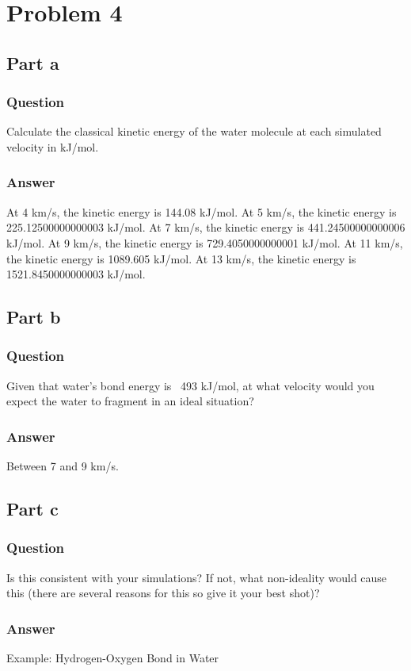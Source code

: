\documentclass[12pt]{article}
\begin{document}
\section{Problem 4}
\subsection{Part a}
\subsubsection{Question}
Calculate the classical kinetic energy of the water molecule at each simulated velocity in kJ/mol.
\subsubsection{Answer}
At 4 km/s, the kinetic energy is 144.08 kJ/mol.
At 5 km/s, the kinetic energy is 225.12500000000003 kJ/mol.
At 7 km/s, the kinetic energy is 441.24500000000006 kJ/mol.
At 9 km/s, the kinetic energy is 729.4050000000001 kJ/mol.
At 11 km/s, the kinetic energy is 1089.605 kJ/mol.
At 13 km/s, the kinetic energy is 1521.8450000000003 kJ/mol.
\subsection{Part b}
\subsubsection{Question}
Given that water’s bond energy is ~493 kJ/mol, at what velocity would you expect the water to fragment in an ideal situation?
\subsubsection{Answer}
Between 7 and 9 km/s.
\subsection{Part c}
\subsubsection{Question}
Is this consistent with your simulations? If not, what non-ideality would cause this (there are several reasons for this so give it your best shot)?
\subsubsection{Answer}
Example: Hydrogen-Oxygen Bond in Water
\end{document}

